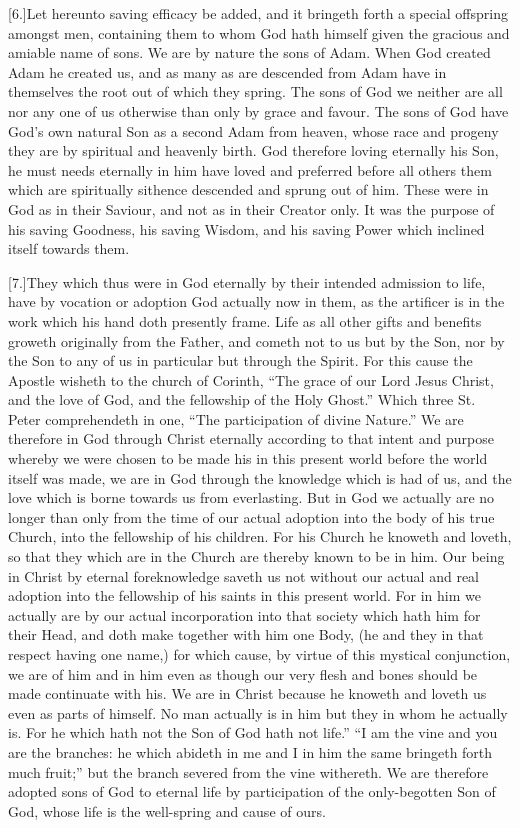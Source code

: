 [6.]Let hereunto saving efficacy be added, and it bringeth forth a special offspring amongst men, containing them to whom God hath himself given the gracious and amiable name of sons. We are by nature the sons of Adam. When God created Adam he created us, and as many as are descended from Adam have in themselves the root out of which they spring. The sons of God we neither are all nor any one of us otherwise than only by grace and favour. The sons of God have God’s own natural Son as a second Adam from heaven, whose race and progeny they are by spiritual and heavenly birth. God therefore loving eternally his Son, he must needs eternally in him have loved and preferred before all others them which are spiritually sithence descended and sprung out of him. These were in God as in their Saviour,  and not as in their Creator only.
 It was the purpose of his saving Goodness, his saving Wisdom, and his saving Power which inclined itself towards them.

[7.]They which thus were in God eternally by their intended admission to life, have by vocation or adoption God actually now in them, as the artificer is in the work which his hand doth presently frame. Life as all other gifts and benefits groweth originally from the Father, and cometh not to us but by the Son, nor by the Son to any of us in particular but through the Spirit. For this cause the Apostle wisheth to the church of Corinth, “The grace of our Lord Jesus Christ, and the love of God, and the fellowship of the Holy Ghost.” Which three St. Peter comprehendeth in one, “The participation of divine Nature.” We are therefore in God through Christ eternally according to that intent and purpose whereby we were chosen to be made his in this present world before the world itself was made, we are in God through the knowledge which is had of us, and the love which is borne towards us from everlasting. But in God we actually are no longer than only from the time of our actual adoption into the body of his true Church, into the fellowship of his children. For his Church he knoweth and loveth, so that they which are in the Church are thereby known to be in him. Our being in Christ by eternal foreknowledge saveth us not without our actual and real adoption into the fellowship of his saints in this present world. For in him we actually are by our actual incorporation into that society which hath him for their Head, and doth make together with him one Body, (he and they in that respect having one name,) for which cause, by virtue of this mystical conjunction, we are of him and in him even as though our very flesh and bones should be made continuate with his. We are in Christ because he knoweth and loveth us even as parts of himself. No man actually is in him but they in whom he actually is. For he which hath not the Son of God hath not life.” “I am the vine and you are the branches: he which abideth in me and I in him the same bringeth forth much fruit;” but  the branch severed from the vine withereth. We are therefore adopted sons of God to eternal life by participation of the only-begotten Son of God, whose life is the well-spring and cause of ours.

